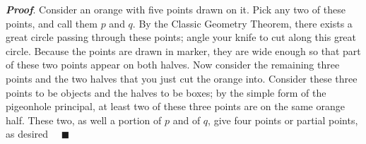 \documentclass{report}
\begin{document}
\begin{itemize}
            \bigbreak \noindent 
            \textbf{\textit{Proof}}. Consider an orange with five points drawn on it. Pick any two of these points, and call them $p$ and $q$. By the Classic Geometry Theorem, there exists a great circle passing through these points; angle your knife to cut along this great circle. Because the points are drawn in marker, they are wide enough so that part of these two points appear on both halves.
            \bigbreak \noindent 
            Now consider the remaining three points and the two halves that you just cut the orange into. Consider these three points to be objects and the halves to be boxes; by the simple form of the pigeonhole principal, at least two of these three points are on the same orange half. These two, as well a portion of $p$ and of $q$, give four points or partial points, as desired $\quad \blacksquare $



    \end{itemize}

    \pagebreak 
\end{document}
